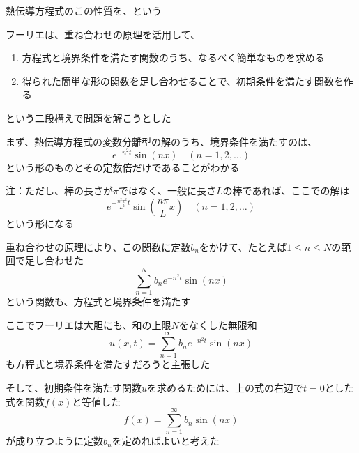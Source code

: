 \documentclass[../book_why-set-theory-why-topology]{subfiles}
\begin{document}
熱伝導方程式のこの性質を、という

\sectionline

フーリエは、重ね合わせの原理を活用して、

\begin{enumerate}
  \item 方程式と境界条件を満たす関数のうち、なるべく簡単なものを求める
  \item 得られた簡単な形の関数を足し合わせることで、初期条件を満たす関数を作る
\end{enumerate}

という二段構えで問題を解こうとした

\br

まず、熱伝導方程式の変数分離型の解のうち、境界条件を満たすのは、
\begin{equation*}
  e^{-n^2 t} \sin(nx) \quad (n=1,2,\ldots)
\end{equation*}
という形のものとその定数倍だけであることがわかる

\begin{leftbar}
  注：ただし、棒の長さが$\pi$ではなく、一般に長さ$L$の棒であれば、ここでの解は
  \begin{equation*}
    e^{-\frac{n^2\pi^2}{L^2}t} \sin\left(\frac{n\pi}{L} x\right) \quad (n=1,2,\ldots)
  \end{equation*}
  という形になる
\end{leftbar}

\br

重ね合わせの原理により、この関数に定数$b_n$をかけて、たとえば$1 \leq n \leq N$の範囲で足し合わせた
\begin{equation*}
  \sum_{n=1}^N b_n e^{-n^2 t} \sin(nx)
\end{equation*}
という関数も、方程式と境界条件を満たす

\br

ここでフーリエは大胆にも、和の上限$N$をなくした無限和
\begin{equation*}
  u(x,t) = \sum_{n=1}^\infty b_n e^{-n^2 t} \sin(nx)
\end{equation*}
も方程式と境界条件を満たすだろうと主張した

\br

そして、初期条件を満たす関数$u$を求めるためには、上の式の右辺で$t=0$とした式を関数$f(x)$と等値した
\begin{equation*}
  f(x) = \sum_{n=1}^\infty b_n \sin(nx)
\end{equation*}
が成り立つように定数$b_n$を定めればよいと考えた
\end{document}
